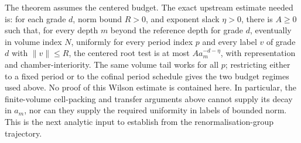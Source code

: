 \begin{remark}\label{ex-centered-open}
The theorem assumes the centered budget. The exact upstream estimate needed is: for each grade $d$, norm bound $R>0$, and exponent slack $\eta>0$, there is $A\geq0$ such that, for every depth $m$ beyond the reference depth for grade $d$, eventually in volume index $N$, uniformly for every period index $p$ and every label $v$ of grade $d$ with $\|v\|\leq R$, the centered root test is at most $A a_m^{-d-\eta}$, with representation and chamber-interiority. The same volume tail works for all $p$; restricting either to a fixed period or to the cofinal period schedule gives the two budget regimes used above. No proof of this Wilson estimate is contained here. In particular, the finite-volume cell-packing and transfer arguments above cannot supply its decay in $a_m$, nor can they supply the required uniformity in labels of bounded norm. This is the next analytic input to establish from the renormalisation-group trajectory.
\end{remark}
